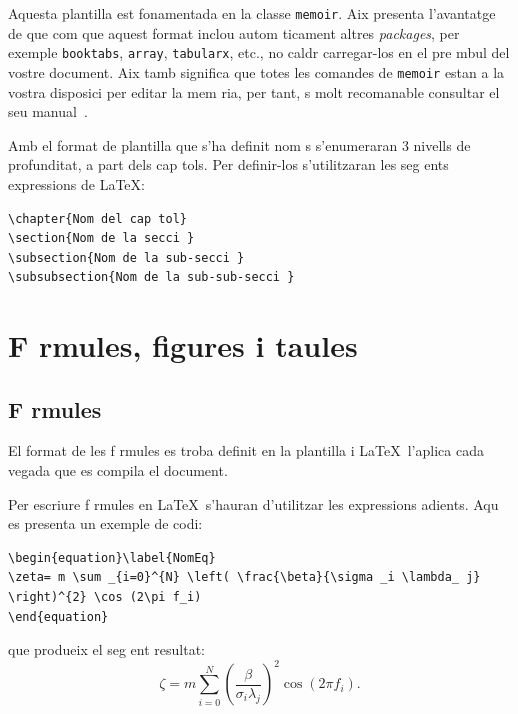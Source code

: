 Aquesta plantilla est  fonamentada en la classe \texttt{memoir}. Aix  presenta l'avantatge de que com que aquest format inclou autom ticament altres \emph{packages}, per exemple \texttt{booktabs},
\texttt{array}, \texttt{tabularx}, etc., no caldr  carregar-los en el pre mbul del vostre document. Aix  tamb  significa que totes les comandes de \texttt{memoir} estan a la vostra disposici  per editar la mem ria, per tant,  s molt recomanable consultar el seu manual~\cite{Wil10}.

Amb el format de plantilla que s'ha definit nom s s'enumeraran 3 nivells de profunditat, a part dels cap tols. Per definir-los s'utilitzaran les
seg ents expressions de \LaTeX:

\begin{verbatim}
\chapter{Nom del cap tol}
\section{Nom de la secci }
\subsection{Nom de la sub-secci }
\subsubsection{Nom de la sub-sub-secci }
\end{verbatim}

\section{F rmules, figures i taules}
\subsection{F rmules}

El format de les f rmules es troba definit en la plantilla i \LaTeX\ l'aplica cada vegada que es compila el document.

Per escriure f rmules en \LaTeX\ s'hauran d'utilitzar les expressions adients. Aqu  es presenta un exemple de codi:
\begin{verbatim}
\begin{equation}\label{NomEq}
\zeta= m \sum _{i=0}^{N} \left( \frac{\beta}{\sigma _i \lambda_ j}
\right)^{2} \cos (2\pi f_i)
\end{equation}
\end{verbatim}
que produeix el seg ent resultat:
\begin{equation}\label{NomEq}
\zeta= m \sum _{i=0}^{N} \left( \frac{\beta}{\sigma _i \lambda_ j}\right)^{2} \cos (2\pi f_i).
\end{equation}

